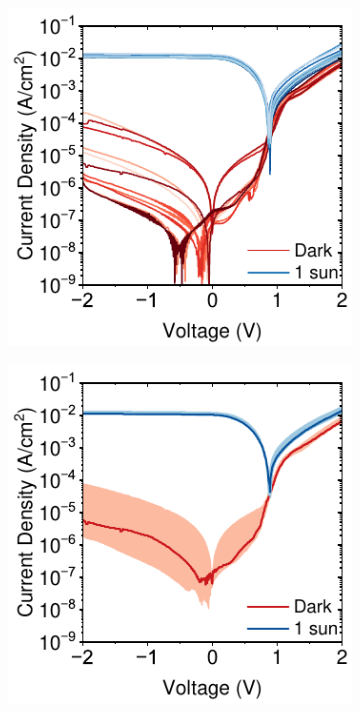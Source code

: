 \begin{figure}[ht!]
    \vspace{1em} %

    \begin{subfigure}[t]{0.4\textwidth}
        \centering
        \includegraphics[width=\textwidth]{chapters/material_properties/images/low_yield_discrete.pdf} %
        \caption{}
        \label{fig:ch2:low_yield_discrete}
    \end{subfigure}
    \hspace{1cm}
    \begin{subfigure}[t]{0.4\textwidth}
        \centering
        \includegraphics[width=\textwidth]{chapters/material_properties/images/low_yield_median.pdf} %

\end{subfigure}
\end{figure}
